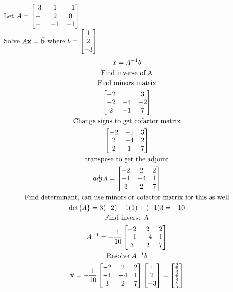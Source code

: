 \documentclass{article}
\begin{document}
    \begin{example}
        Let $A=\bmqty{3 & 1 & -1\\
        -1 & 2 & 0\\
        -1 & -1 & -1}$\\
        Solve $A\va{x}=\va{b}$ where $b=\bmqty{1 \\ 2 \\ -3}$
        \begin{gather*}
            x=A^{-1}b\\
            \text{Find inverse of A}\\
            \text{Find minors matrix}\\
            \bmqty{-2 & 1 & 3\\
            -2 & -4 & -2\\
            2 & -1 & 7}\\
            \text{Change signs to get cofactor matrix}\\
            \bmqty{-2 & -1 & 3\\
            2 & -4 & 2\\
            2 & 1 & 7}\\
            \text{transpose to get the adjoint}\\
            adj{A}=\bmqty{-2 & 2 & 2 \\
            -1 & -4 & 1 \\
            3 & 2 & 7}\\
            \text{Find determinant, can use minors or cofactor matrix for this as well}\\
            \det{A}=3(-2) - 1(1) + (-1)3 = -10\\
            \text{Find inverse A}\\
            A^{-1} = -\frac{1}{10}\bmqty{-2 & 2 & 2 \\
            -1 & -4 & 1 \\
            3 & 2 & 7}\\
            \text{Resolve $A^{-1}b$}\\
            \va{x}=-\frac{1}{10}\bmqty{-2 & 2 & 2 \\
            -1 & -4 & 1 \\
            3 & 2 & 7}\bmqty{1 \\ 2 \\ -3}
            =\bmqty{\frac{2}{5} \\
            \frac{6}{5}\\
            \frac{7}{5}
            }
        \end{gather*}
    \end{example}
\end{document}
